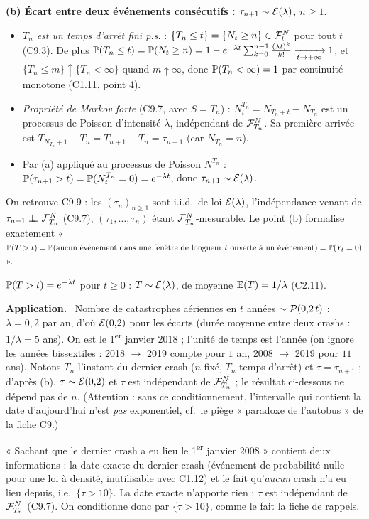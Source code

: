 \documentclass[11pt,a4paper]{article}
\newcommand{\question}[1]{\par\medskip\noindent\textbf{#1}~}
\begin{document}
\begin{exo}
\question{(b) Écart entre deux événements consécutifs : $\tau_{n+1}\sim\mathcal{E}(\lambda)$, $n\ge1$.}
\begin{itemize}
  \item \emph{$T_n$ est un temps d'arrêt fini p.s.} : $\{T_n\le t\}=\{N_t\ge n\}\in\mathcal{F}^N_t$ pour tout $t$ (C9.3). De plus
  $\mathbb{P}(T_n\le t)=\mathbb{P}(N_t\ge n)=1-e^{-\lambda t}\sum_{k=0}^{n-1}\frac{(\lambda t)^k}{k!}\xrightarrow[t\to+\infty]{}1$, et
  $\{T_n\le m\}\uparrow\{T_n<\infty\}$ quand $m\uparrow\infty$, donc $\mathbb{P}(T_n<\infty)=1$ par continuité monotone (C1.11, point 4).
  \item \emph{Propriété de Markov forte} (C9.7, avec $S=T_n$) : $N^{T_n}_t=N_{T_n+t}-N_{T_n}$ est un processus de Poisson d'intensité
  $\lambda$, indépendant de $\mathcal{F}^N_{T_n}$. Sa première arrivée est $T_{N_{T_n}+1}-T_n=T_{n+1}-T_n=\tau_{n+1}$ (car $N_{T_n}=n$).
  \item Par (a) appliqué au processus de Poisson $N^{T_n}$ : $\mathbb{P}(\tau_{n+1}>t)=\mathbb{P}(N^{T_n}_t=0)=e^{-\lambda t}$, donc
  $\tau_{n+1}\sim\mathcal{E}(\lambda)$.
\end{itemize}
On retrouve C9.9 : les $(\tau_n)_{n\ge1}$ sont i.i.d.\ de loi $\mathcal{E}(\lambda)$, l'indépendance venant de
$\tau_{n+1}\perp\!\!\!\perp\mathcal{F}^N_{T_n}$ (C9.7), $(\tau_1,\dots,\tau_n)$ étant $\mathcal{F}^N_{T_n}$-mesurable. Le point (b) formalise exactement
« $\mathbb{P}(T>t)=\mathbb{P}(\text{aucun événement dans une fenêtre de longueur $t$ ouverte à un événement})=\mathbb{P}(Y_t=0)$ ».

\begin{resultat}
$\mathbb{P}(T>t)=e^{-\lambda t}$ pour $t\ge0$ : \quad $T\sim\mathcal{E}(\lambda)$, de moyenne $\mathbb{E}(T)=1/\lambda$ (C2.11).
\end{resultat}

\question{Application.} Nombre de catastrophes aériennes en $t$ années $\sim\mathcal{P}(0{,}2\,t)$ : $\lambda=0{,}2$ par an, d'où
$\mathcal{E}(0{,}2)$ pour les écarts (durée moyenne entre deux crashs : $1/\lambda=5$ ans). On est le 1\textsuperscript{er} janvier 2018 ;
l'unité de temps est l'année (on ignore les années bissextiles : 2018 $\to$ 2019 compte pour $1$ an, 2008 $\to$ 2019 pour $11$ ans).
Notons $T_n$ l'instant du dernier crash ($n$ fixé, $T_n$ temps d'arrêt) et $\tau=\tau_{n+1}$ ; d'après (b), $\tau\sim\mathcal{E}(0{,}2)$ et
$\tau$ est indépendant de $\mathcal{F}^N_{T_n}$ ; le résultat ci-dessous ne dépend pas de $n$. (Attention : sans ce conditionnement, l'intervalle
qui contient la date d'aujourd'hui n'est \emph{pas} exponentiel, cf.\ le piège « paradoxe de l'autobus » de la fiche C9.)

\begin{alerte}
« Sachant que le dernier crash a eu lieu le 1\textsuperscript{er} janvier 2008 » contient deux informations : la date exacte du dernier crash
(événement de probabilité nulle pour une loi à densité, inutilisable avec C1.12) et le fait qu'\emph{aucun} crash n'a eu lieu depuis,
i.e.\ $\{\tau>10\}$. La date exacte n'apporte rien : $\tau$ est indépendant de $\mathcal{F}^N_{T_n}$ (C9.7). On conditionne donc par $\{\tau>10\}$,
comme le fait la fiche de rappels.
\end{alerte}


\end{exo}
\end{document}
